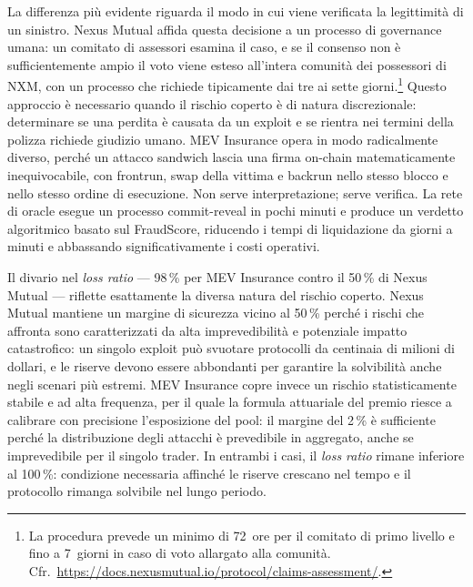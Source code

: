 \documentclass[a4paper,11pt]{article}
\begin{document}
La differenza più evidente riguarda il modo in cui viene verificata la
legittimità di un sinistro. Nexus Mutual affida questa decisione a un processo
di governance umana: un comitato di assessori esamina il caso, e se il consenso
non è sufficientemente ampio il voto viene esteso all'intera comunità dei
possessori di NXM, con un processo che richiede tipicamente dai tre ai sette
giorni.\footnote{La procedura prevede un minimo di 72~ore per il comitato di
primo livello e fino a 7~giorni in caso di voto allargato alla comunità. Cfr.\
\url{https://docs.nexusmutual.io/protocol/claims-assessment/}.} Questo approccio
è necessario quando il rischio coperto è di natura discrezionale: determinare
se una perdita è causata da un exploit e se rientra nei termini della polizza
richiede giudizio umano. MEV Insurance opera in modo radicalmente diverso,
perché un attacco sandwich lascia una firma on-chain matematicamente
inequivocabile, con frontrun, swap della vittima e backrun nello stesso blocco e
nello stesso ordine di esecuzione. Non serve interpretazione; serve verifica. La
rete di oracle esegue un processo commit-reveal in pochi minuti e produce un
verdetto algoritmico basato sul FraudScore, riducendo i tempi di liquidazione da
giorni a minuti e abbassando significativamente i costi operativi.

Il divario nel \emph{loss ratio} --- \num{98}\,\% per MEV Insurance contro il
\num{50}\,\% di Nexus Mutual --- riflette esattamente la diversa natura del
rischio coperto. Nexus Mutual mantiene un margine di sicurezza vicino al
\num{50}\,\% perché i rischi che affronta sono caratterizzati da alta
imprevedibilità e potenziale impatto catastrofico: un singolo exploit può
svuotare protocolli da centinaia di milioni di dollari, e le riserve devono
essere abbondanti per garantire la solvibilità anche negli scenari più estremi.
MEV Insurance copre invece un rischio statisticamente stabile e ad alta
frequenza, per il quale la formula attuariale del premio riesce a calibrare con
precisione l'esposizione del pool: il margine del \num{2}\,\% è sufficiente
perché la distribuzione degli attacchi è prevedibile in aggregato, anche se
imprevedibile per il singolo trader. In entrambi i casi, il \emph{loss ratio}
rimane inferiore al \num{100}\,\%: condizione necessaria affinché le riserve
crescano nel tempo e il protocollo rimanga solvibile nel lungo periodo.
\end{document}

